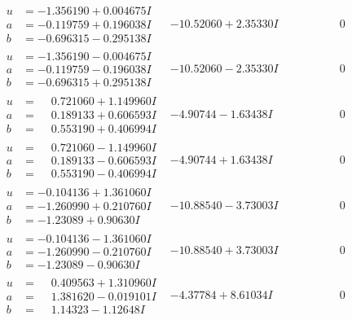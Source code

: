 \documentclass[1p]{elsarticle_modified}
\theoremstyle{definition}
\begin{document}
$$\begin{array}{c|c|c}
\begin{aligned}
u &= -1.356190 + 0.004675 I \\
a &= -0.119759 + 0.196038 I \\
b &= -0.696315 - 0.295138 I\end{aligned}
 & -10.52060 + 2.35330 I & \phantom{-0.000000 } 0 \\ \hline\begin{aligned}
u &= -1.356190 - 0.004675 I \\
a &= -0.119759 - 0.196038 I \\
b &= -0.696315 + 0.295138 I\end{aligned}
 & -10.52060 - 2.35330 I & \phantom{-0.000000 } 0 \\ \hline\begin{aligned}
u &= \phantom{-}0.721060 + 1.149960 I \\
a &= \phantom{-}0.189133 + 0.606593 I \\
b &= \phantom{-}0.553190 + 0.406994 I\end{aligned}
 & -4.90744 - 1.63438 I & \phantom{-0.000000 } 0 \\ \hline\begin{aligned}
u &= \phantom{-}0.721060 - 1.149960 I \\
a &= \phantom{-}0.189133 - 0.606593 I \\
b &= \phantom{-}0.553190 - 0.406994 I\end{aligned}
 & -4.90744 + 1.63438 I & \phantom{-0.000000 } 0 \\ \hline\begin{aligned}
u &= -0.104136 + 1.361060 I \\
a &= -1.260990 + 0.210760 I \\
b &= -1.23089 + 0.90630 I\end{aligned}
 & -10.88540 - 3.73003 I & \phantom{-0.000000 } 0 \\ \hline\begin{aligned}
u &= -0.104136 - 1.361060 I \\
a &= -1.260990 - 0.210760 I \\
b &= -1.23089 - 0.90630 I\end{aligned}
 & -10.88540 + 3.73003 I & \phantom{-0.000000 } 0 \\ \hline\begin{aligned}
u &= \phantom{-}0.409563 + 1.310960 I \\
a &= \phantom{-}1.381620 - 0.019101 I \\
b &= \phantom{-}1.14323 - 1.12648 I\end{aligned}
 & -4.37784 + 8.61034 I & \phantom{-0.000000 } 0\\

\end{array}$$
\end{document}
